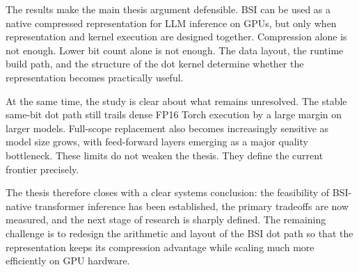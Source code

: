 The results make the main thesis argument defensible. BSI can be used as a native compressed representation for LLM inference on GPUs, but only when representation and kernel execution are designed together. Compression alone is not enough. Lower bit count alone is not enough. The data layout, the runtime build path, and the structure of the dot kernel determine whether the representation becomes practically useful.

At the same time, the study is clear about what remains unresolved. The stable same-bit dot path still trails dense FP16 Torch execution by a large margin on larger models. Full-scope replacement also becomes increasingly sensitive as model size grows, with feed-forward layers emerging as a major quality bottleneck. These limits do not weaken the thesis. They define the current frontier precisely.

The thesis therefore closes with a clear systems conclusion: the feasibility of BSI-native transformer inference has been established, the primary tradeoffs are now measured, and the next stage of research is sharply defined. The remaining challenge is to redesign the arithmetic and layout of the BSI dot path so that the representation keeps its compression advantage while scaling much more efficiently on GPU hardware.
